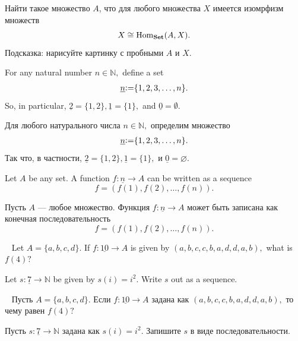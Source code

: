 \documentclass[../main/CT4S-EN-RU]{subfiles}
\begin{document}
\begin{exerciseRUS}\label{exc:generator for set}
Найти такое множество $A$, что для любого множества $X$ имеется изомрфизм множеств $$X\cong\operatorname{Hom}_{\mathbf{Set}}(A,X).$$ Подсказка: нарисуйте картинку с пробными $A$ и $X.$
\end{exerciseRUS}

\begin{blockENG}
For any natural number $n\in{ℕ},$ define a set 
\begin{align}\label{dia:underline n}\index{a symbol!$\underline{n}$}
\underline{n}{\coloneqq}\{1,2,3,\ldots,n\}.
\end{align}
So, in particular, $\underline{2}=\{1,2\}, \underline{1}=\{1\},$ and $\underline{0}=\emptyset.$ 
\end{blockENG}

\begin{blockRUS}
Для любого натурального числа $n\in{ℕ},$ определим множество 
\begin{align}\label{dia:underline n}\index{символ!$\underline{n}$}
\underline{n}{\coloneqq}\{1,2,3,\ldots,n\}.
\end{align}
Так что, в частности, $\underline{2}=\{1,2\}, \underline{1}=\{1\},$ и $\underline{0}=\varnothing.$ 
\end{blockRUS}

\begin{blockENG}
Let $A$ be any set. A function $f\colon\underline{n}{→} A$ can be written as a sequence $$f=(f(1),f(2),\ldots,f(n)).$$
\end{blockENG}

\begin{blockRUS}
Пусть $A$ — любое множество. Функция $f\colon\underline{n}{→} A$ может быть записана как конечная последовательность $$f=(f(1),f(2),\ldots,f(n)).$$
\end{blockRUS}

\begin{exerciseENG}\label{exc:sequence}~
\sexc Let $A=\{a,b,c,d\}.$ If $f\colon\underline{10}{→} A$ is given by $(a,b,c,c,b,a,d,d,a,b),$ what is $f(4)?$
\item Let $s\colon\underline{7}{→}{ℕ}$ be given by $s(i)=i^2.$ Write $s$ out as a sequence.
\endsexc
\end{exerciseENG}

\begin{exerciseRUS}\label{exc:sequence}~
 \sexc Пусть $A=\{a,b,c,d\}.$ Если $f\colon\underline{10}{→} A$ задана как $(a,b,c,c,b,a,d,d,a,b),$ то чему равен $f(4)?$
\item Пусть $s\colon\underline{7}{→}{ℕ}$ задана как $s(i)=i^2.$ Запишите $s$ в виде последовательности.
\endsexc
\end{exerciseRUS}
\end{document}
